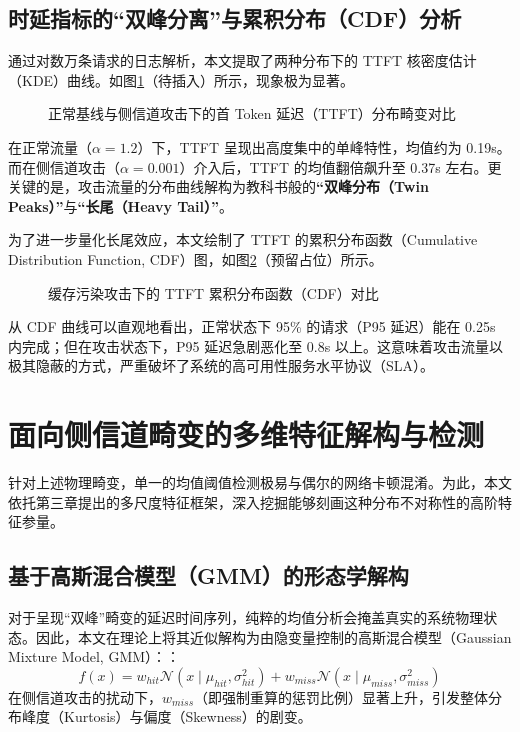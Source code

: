 \documentclass[master, vlined]{DissertUESTC}
\begin{document}
	\subsection{时延指标的“双峰分离”与累积分布（CDF）分析}
	通过对数万条请求的日志解析，本文提取了两种分布下的 TTFT 核密度估计（KDE）曲线。如图\ref{fig: 正常与侧信道攻击下的TTFT分布对比}（待插入）所示，现象极为显著。

	\begin{figure}[!htb]
		\centering
		\caption{正常基线与侧信道攻击下的首 Token 延迟（TTFT）分布畸变对比} \label{fig: 正常与侧信道攻击下的TTFT分布对比}
	\end{figure}

	在正常流量（$\alpha=1.2$）下，TTFT 呈现出高度集中的单峰特性，均值约为 0.19s。而在侧信道攻击（$\alpha=0.001$）介入后，TTFT 的均值翻倍飙升至 0.37s 左右。更关键的是，攻击流量的分布曲线解构为教科书般的\textbf{“双峰分布（Twin Peaks）”}与\textbf{“长尾（Heavy Tail）”}。

	为了进一步量化长尾效应，本文绘制了 TTFT 的累积分布函数（Cumulative Distribution Function, CDF）图，如图\ref{fig: TTFT累积分布函数图}（预留占位）所示。
	
	\begin{figure}[!htb]
		\centering
		\caption{缓存污染攻击下的 TTFT 累积分布函数（CDF）对比} \label{fig: TTFT累积分布函数图}
	\end{figure}

	从 CDF 曲线可以直观地看出，正常状态下 95\% 的请求（P95 延迟）能在 0.25s 内完成；但在攻击状态下，P95 延迟急剧恶化至 0.8s 以上。这意味着攻击流量以极其隐蔽的方式，严重破坏了系统的高可用性服务水平协议（SLA）。 

	\section{面向侧信道畸变的多维特征解构与检测}

	针对上述物理畸变，单一的均值阈值检测极易与偶尔的网络卡顿混淆。为此，本文依托第三章提出的多尺度特征框架，深入挖掘能够刻画这种分布不对称性的高阶特征参量。

	\subsection{基于高斯混合模型（GMM）的形态学解构}
	对于呈现“双峰”畸变的延迟时间序列，纯粹的均值分析会掩盖真实的系统物理状态。因此，本文在理论上将其近似解构为由隐变量控制的高斯混合模型（Gaussian Mixture Model, GMM）\cite{高斯混合模型理论与应用}：：
	\begin{equation}
		f(x) = w_{hit} \mathcal{N}(x \mid \mu_{hit}, \sigma_{hit}^2) + w_{miss} \mathcal{N}(x \mid \mu_{miss}, \sigma_{miss}^2)
	\end{equation}
	在侧信道攻击的扰动下，$w_{miss}$（即强制重算的惩罚比例）显著上升，引发整体分布峰度（Kurtosis）与偏度（Skewness）的剧变。
\end{document}
